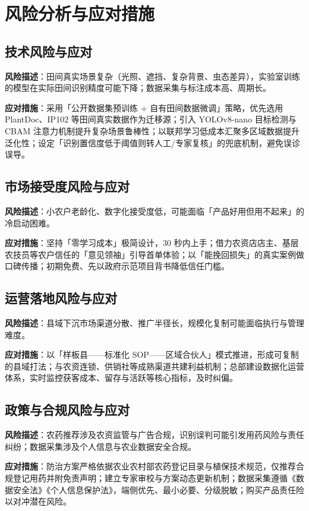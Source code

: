\chapter{风险分析与应对措施}

\section{技术风险与应对}

\textbf{风险描述}：田间真实场景复杂（光照、遮挡、复杂背景、虫态差异），实验室训练的模型在实际田间识别精度可能下降；数据采集与标注成本高、周期长。

\textbf{应对措施}：采用「公开数据集预训练 + 自有田间数据微调」策略，优先选用 PlantDoc、IP102 等田间真实数据作为迁移源；引入 YOLOv8-nano 目标检测与 CBAM 注意力机制提升复杂场景鲁棒性；以联邦学习低成本汇聚多区域数据提升泛化性；设定「识别置信度低于阈值则转人工/专家复核」的兜底机制，避免误诊误导。

\section{市场接受度风险与应对}

\textbf{风险描述}：小农户老龄化、数字化接受度低，可能面临「产品好用但用不起来」的冷启动困难。

\textbf{应对措施}：坚持「零学习成本」极简设计，30 秒内上手；借力农资店店主、基层农技员等农户信任的「意见领袖」引导首单体验；以「能挽回损失」的真实案例做口碑传播；初期免费、先以政府示范项目背书降低信任门槛。

\section{运营落地风险与应对}

\textbf{风险描述}：县域下沉市场渠道分散、推广半径长，规模化复制可能面临执行与管理难度。

\textbf{应对措施}：以「样板县——标准化 SOP——区域合伙人」模式推进，形成可复制的县域打法；与农资连锁、供销社等成熟渠道共建利益机制；总部建设数据化运营体系，实时监控获客成本、留存与活跃等核心指标，及时纠偏。

\section{政策与合规风险与应对}

\textbf{风险描述}：农药推荐涉及农资监管与广告合规，识别误判可能引发用药风险与责任纠纷；数据采集涉及个人信息与农业数据安全合规。

\textbf{应对措施}：防治方案严格依据农业农村部农药登记目录与植保技术规范，仅推荐合规登记用药并附免责声明；建立专家审校与方案动态更新机制；数据采集遵循《数据安全法》《个人信息保护法》，端侧优先、最小必要、分级脱敏；购买产品责任险以对冲潜在风险。
